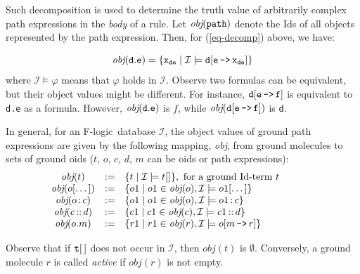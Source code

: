 \documentclass[11pt]{article}
\newcommand{\obj}{\textit{obj}\xspace}
\newcommand{\db}[1]{\ensuremath{\mathcal{#1}}}
\newcommand{\isa}{\,{\bf{:}}\,}
\newcommand{\subcl}{\,{\bf{::}}\,}
\newcommand{\mvd}{{\mbox{\tt \,->\,}}}  %
\newcommand{\fl}{\mbox{F-logic}\xspace}
\begin{document}
\noindent
Such decomposition is used to determine the truth value of arbitrarily complex
path expressions in the \emph{body} of a rule.  Let $\tt \obj(path)$ denote
the Ids of all objects represented by the path expression. Then, for
(\ref{eq-decomp}) above, we have:

\begin{displaymath} \tt
\obj(d.e) = \{x_{de} \mid \db I \models d[e\mvd 
x_{de}]\} 
\end{displaymath}
%
where $\db I \models \varphi$ means that $\varphi$ holds in \db I.  Observe
two formulas can be equivalent, but their object values might be different.
For instance, $\tt d[e\mvd f]$ is equivalent to {\tt d.e} as a formula.
However, $\tt \obj(d.e)$ is $f$, while $\tt \obj(d[e\mvd f])$ is {\tt d}.

In general, for an \fl\ database \db I, the object values of ground path
expressions are given by the following mapping, \obj, from ground molecules
to sets of ground oids ($t$, $o$, $c$, $d$, $m$ can be oids or path
expressions):
%
\begin{displaymath}
  \begin{array}{cll@{\hspace{4em}}c}
    \obj(t) & := & \{t \mid  \db I\models t[] \}, 
     \textrm{ for a ground Id-term $t$}  \\   
    \obj(o[\dots]) & := & \{o1 \mid o1\in\obj(o), \db I \models o1[\dots]
    \} \\  
    \obj(o\isa c) & := & \{o1 \mid o1\in\obj(o), \db I \models o1\isa c\}
     \\ 
    \obj(c\subcl d) & := & \{c1 \mid c1\in\obj(c), \db I \models c1\subcl
    d\} \\ 
    \obj(o.m) & :=  & \{r1 \mid r1\in\obj(r), \db I \models o[m\mvd
    r]\}  
  \end{array}
\end{displaymath}

Observe that if $\tt t[\,]$ does not occur in \db{I}, then $\obj(t)$ is
$\emptyset$.  Conversely, a ground molecule $r$ is called \emph{active} if
$\obj(r)$ is not empty.
\end{document}
